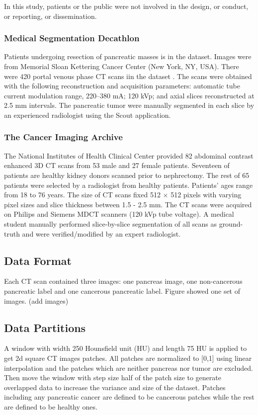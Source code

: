 In this study, patients or the public were not involved in the design, or conduct, or reporting, or dissemination. 

\subsubsection{Medical Segmentation Decathlon}
Patients undergoing resection of pancreatic masses is in the dataset. Images were from Memorial Sloan Kettering Cancer Center (New York, NY, USA). There were 420 portal venous phase CT scans iin the dataset . The scans were obtained with the following reconstruction and acquisition parameters: automatic tube current modulation range, 220–380 mA; 120 kVp; and axial slices
reconstructed at 2.5 mm intervals. The pancreatic tumor were manually segmented in each slice by an experienced radiologist using the Scout application. \cite{simpson2019large} 


\subsubsection{The Cancer Imaging Archive}
The National Institutes of Health Clinical Center provided 82 abdominal contrast enhanced 3D CT scans from 53 male and 27 female patients. Seventeen of patients are healthy kidney donors scanned prior to nephrectomy. The rest of 65 patients were selected by a radiologist from healthy patients. Patients' ages range from 18 to 76 years. The size of CT scans fixed 512 $\times$ 512 pixels with varying pixel sizes and slice thickness between 1.5 - 2.5 mm. The CT scans were acquired on Philips and Siemens MDCT scanners (120 kVp tube voltage). A medical student manually performed slice-by-slice segmentation of all scans as ground-truth and were verified/modified by an expert radiologist. 
\cite{roth}

\subsection{Data Format}
Each CT scan contained three images: one pancreas image, one non-cancerous pancreatic label and one cancerous pancreatic label. Figure showed one set of images. (add images)



\subsection{Data Partitions}


A window with width 250 Hounsfield unit (HU) and length 75 HU is applied to get 2d square CT images patches. All patches are normalized to [0,1] using linear interpolation and the patches which are neither pancreas nor tumor are excluded. Then move the window with step size half of the patch size to generate overlapped data to increase the variance and size of the dataset. Patches including any pancreatic cancer are defined to be cancerous patches while the rest are defined to be healthy ones.

